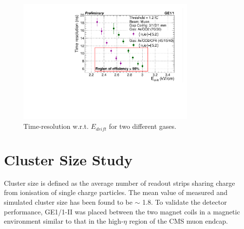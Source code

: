 \begin{figure}[!h]
\centering
\includegraphics[width=3.5in]{figures/GEM/TimeResolution_wrt_EDrift.pdf}
\caption{Time-resolution w.r.t. $E_{drift}$ for two different gases.}
\label{TimeResolution}
\end{figure}



% 

\section{Cluster Size Study}

Cluster size is defined as the average number of readout strips sharing charge from ionisation of single charge particles. The mean value of measured and simulated cluster size has been found to be $\sim$ 1.8. To validate the detector performance, GE1/1-II was placed between the two magnet coils in a magnetic environment similar to that in the high-$\eta$ region of the CMS muon endcap.

